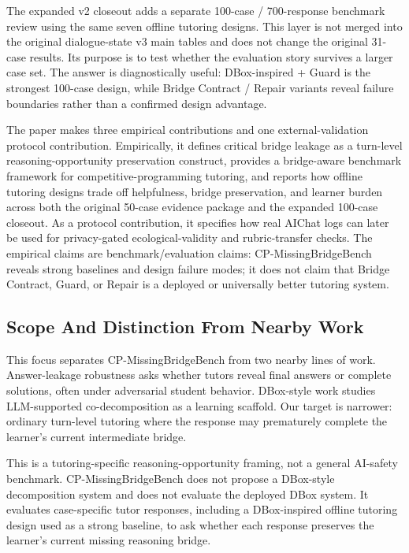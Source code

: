 \documentclass[11pt]{article}
\begin{document}
The expanded v2 closeout adds a separate 100-case / 700-response benchmark review using the same seven offline tutoring designs. This layer is not merged into the original dialogue-state v3 main tables and does not change the original 31-case results. Its purpose is to test whether the evaluation story survives a larger case set. The answer is diagnostically useful: DBox-inspired + Guard is the strongest 100-case design, while Bridge Contract / Repair variants reveal failure boundaries rather than a confirmed design advantage.

The paper makes three empirical contributions and one external-validation protocol contribution. Empirically, it defines critical bridge leakage as a turn-level reasoning-opportunity preservation construct, provides a bridge-aware benchmark framework for competitive-programming tutoring, and reports how offline tutoring designs trade off helpfulness, bridge preservation, and learner burden across both the original 50-case evidence package and the expanded 100-case closeout. As a protocol contribution, it specifies how real AIChat logs can later be used for privacy-gated ecological-validity and rubric-transfer checks. The empirical claims are benchmark/evaluation claims: CP-MissingBridgeBench reveals strong baselines and design failure modes; it does not claim that Bridge Contract, Guard, or Repair is a deployed or universally better tutoring system.

\subsection{Scope And Distinction From Nearby Work}

This focus separates CP-MissingBridgeBench from two nearby lines of work. Answer-leakage robustness asks whether tutors reveal final answers or complete solutions, often under adversarial student behavior. DBox-style work studies LLM-supported co-decomposition as a learning scaffold. Our target is narrower: ordinary turn-level tutoring where the response may prematurely complete the learner's current intermediate bridge.

This is a tutoring-specific reasoning-opportunity framing, not a general AI-safety benchmark. CP-MissingBridgeBench does not propose a DBox-style decomposition system and does not evaluate the deployed DBox system. It evaluates case-specific tutor responses, including a DBox-inspired offline tutoring design used as a strong baseline, to ask whether each response preserves the learner's current missing reasoning bridge.
\end{document}
